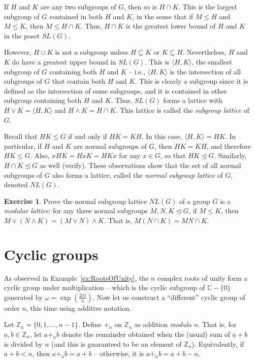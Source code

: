 \documentclass[svgnames]{article}
\theoremstyle{definition}
\newtheorem{Exercise}{Exercise}[section]
\theoremstyle{remark}
\begin{document}
\begin{appendices}
If $H$ and $K$ are any two subgroups of $G$, then so is $H \cap K$. This is the largest subgroup of $G$ contained in both $H$ and $K$, in the sense that if $M \le H$ and $M \le K$, then $M \le H \cap K$. Thus, $H \cap K$ is the greatest lower bound of $H$ and $K$ in the poset $SL(G)$.

\label{def:Join} However, $H \cup K$ is not a subgroup unless $H \subseteq K$ or $K \subseteq H$. Nevertheless, $H$ and $K$ do have a greatest upper bound in $SL(G)$. This is $\langle H, K \rangle$, the smallest subgroup of $G$ containing both $H$ and $K$ -- i.e., $\langle H, K \rangle$ is the intersection of all subgroups of $G$ that contain both $H$ and $K$. This is clearly a subgroup since it is defined as the intersection of some subgroups, and it is contained in other subgroup containing both $H$ and $K$. Thus, $SL(G)$ forms a lattice with $H \vee K = \langle H, K \rangle$ and $H \wedge K = H \cap K$. This lattice is called the \emph{subgroup lattice} of $G$.

\label{def:NL(G)}Recall that $HK \le G$ if and only if $HK = KH$. In this case, $\langle H, K \rangle = HK$. In particular, if $H$ and $K$ are normal subgroups of $G$, then $HK = KH$, and therefore $HK \le G$. Also, $xHK = HxK = HKx$ for any $x \in G$, so that $HK \unlhd G$. Similarly, $H \cap K \unlhd G$ as well {\small (verify)}. These observations show that the set of all normal subgroups of $G$ also forms a lattice, called the \emph{normal subgroup lattice} of $G$, denoted $NL(G)$.
\begin{Exercise}
Prove the normal subgroup lattice $NL(G)$ of a group $G$ is a \emph{modular lattice}: for any three normal subgroups $M, N, K \unlhd G$, if $M \le K$, then $M \vee (N \wedge K) = (M \vee N) \wedge K$. That is, $M(N \cap K) = MN \cap K$.
\end{Exercise}

\section{Cyclic groups}\label{sec:CycGroups}
As observed in Example~\ref{ex:RootsOfUnity}, the $n$ complex roots of unity form a cyclic group under multiplication -- which is the cyclic subgroup of $\mathbb C - \{0\}$ generated by $\omega = \exp(\frac{2\pi i}{n})$. Now let us construct a ``different'' cyclic group of order $n$, this time using additive notation.

\label{def:Zn} Let $\mathbb Z_n = \{0, 1, \ldots, n - 1\}$. Define $+_n$ on $\mathbb Z_n$ as addition \emph{modulo $n$}. That is, for $a, b \in \mathbb Z_n$, let $a +_n b$ denote the remainder obtained when the (usual) sum of $a + b$ is divided by $n$ (and this is guaranteed to be an element of $\mathbb Z_n$). Equivalently, if $a + b < n$, then $a +_n b = a + b$  -- otherwise, it is $a +_n b = a + b - n$.


\end{appendices}
\end{document}

